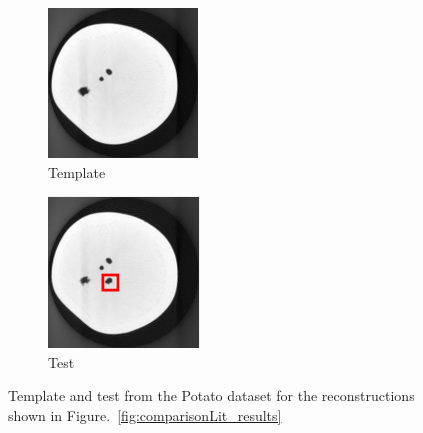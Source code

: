 \documentclass{article}
\begin{document}
\begin{figure}[!h]
  \centering
    \begin{subfigure}[b]{0.24\linewidth}
        \includegraphics[width=\textwidth]{../images/potato/template_3.png}
        \caption{Template}
     \end{subfigure}
\quad
    \begin{subfigure}[b]{0.24\linewidth}
        \includegraphics[width=\textwidth]{../images/potato/testIm_color.png}
        \caption{Test}
    \end{subfigure}
     \caption{Template and test from the Potato dataset for the reconstructions shown in Figure.~\ref{fig:comparisonLit_results}} 
\label{fig:comparisonLit_dataset}
\end{figure}
\end{document}
